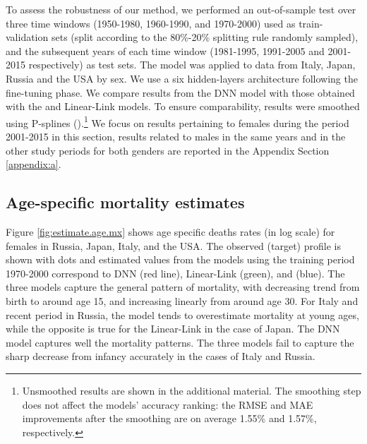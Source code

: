 \documentclass[a4,11pt]{article}
\begin{document}
To assess the robustness of our method, we performed an out-of-sample test over three time windows (1950-1980, 1960-1990, and 1970-2000) used as train-validation sets (split according to the 80\%-20\% splitting rule randomly sampled), and the subsequent years of each time window (1981-1995, 1991-2005 and 2001-2015 respectively) as test sets. The model was applied to data from Italy, Japan, Russia and the USA by sex. We use a six hidden-layers architecture following the fine-tuning phase. We compare results from the DNN model with those obtained with the \citet{Sevcikova} and Linear-Link models. To ensure comparability, results were smoothed using P-splines (\cite{HeNg}).\footnote{Unsmoothed results are shown in the additional material. The smoothing step does not affect the models' accuracy ranking: the RMSE and MAE improvements after the smoothing are on average 1.55\% and 1.57\%, respectively.}  We focus on results pertaining to females during the period 2001-2015 in this section, results related to males in the same years and in the other study periods for both genders are reported in the Appendix Section \ref{appendix:a}. 

\subsection*{Age-specific mortality estimates}

Figure \ref{fig:estimate.age.mx} shows age specific deaths rates (in log scale) for females in Russia, Japan, Italy, and the USA. The observed (target) profile is shown with dots and estimated values from the models using the training period 1970-2000 correspond to DNN (red line), Linear-Link (green), and \citet{Sevcikova} (blue). The three models capture the general pattern of mortality, with decreasing trend from birth to around age 15, and increasing linearly from around age 30. For Italy and recent period in Russia, the \citet{Sevcikova} model tends to overestimate mortality at young ages, while the opposite is true for the Linear-Link in the case of Japan. The DNN model captures well the mortality patterns. The three models fail to capture the sharp decrease from infancy accurately in the cases of Italy and Russia.
\end{document}
